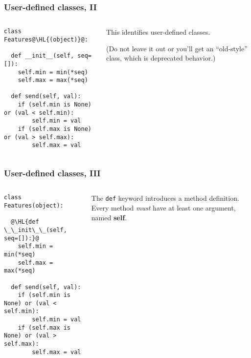 \documentclass[english,serif,mathserif,xcolor=pdftex,dvipsnames,table]{beamer}
\begin{document}
\begin{frame}[fragile]
  \frametitle{User-defined classes, II}
  \begin{columns}[t]
    \begin{column}{0.5\textwidth}
\begin{lstlisting}
class Features@\HL{(object)}@:

  def __init__(self, seq=[]):
    self.min = min(*seq)
    self.max = max(*seq)

  def send(self, val):
    if (self.min is None) or (val < self.min):
        self.min = val
    if (self.max is None) or (val > self.max):
        self.max = val
\end{lstlisting}
    \end{column}
    \begin{column}{0.5\textwidth}
      \raggedleft 
      This identifies user-defined classes.

      (Do not leave it out or you'll get an ``old-style'' class, which
      is deprecated behavior.)
    \end{column}
  \end{columns}
\end{frame}


\begin{frame}[fragile]
  \frametitle{User-defined classes, III}
  \begin{columns}[t]
    \begin{column}{0.5\textwidth}
\begin{lstlisting}
class Features(object):

  @\HL{def \_\_init\_\_(self, seq=[]):}@
    self.min = min(*seq)
    self.max = max(*seq)

  def send(self, val):
    if (self.min is None) or (val < self.min):
        self.min = val
    if (self.max is None) or (val > self.max):
        self.max = val
\end{lstlisting}
    \end{column}
    \begin{column}{0.5\textwidth}
      \raggedleft 
      The \texttt{def} keyword introduces a method definition.
      Every method \emph{must} have at least one argument,
      named \textbf{self}.
    \end{column}
  \end{columns}
\end{frame}
\end{document}
